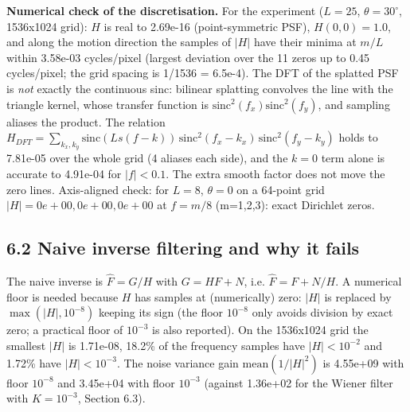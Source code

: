 \documentclass[10pt,a4paper]{article}
\begin{document}
\textbf{Numerical check of the discretisation.} For the experiment ($L=25$, $\theta=30^\circ$, 1536x1024 grid): $H$ is real to 2.69e-16 (point-symmetric PSF), $H(0,0)=1.0$, and along the motion direction the samples of $|H|$ have their minima at $m/L$ within 3.58e-03 cycles/pixel (largest deviation over the 11 zeros up to 0.45 cycles/pixel; the grid spacing is 1/1536 = 6.5e-4). The DFT of the splatted PSF is \textit{not} exactly the continuous sinc: bilinear splatting convolves the line with the triangle kernel, whose transfer function is $\mathrm{sinc}^2(f_x)\mathrm{sinc}^2(f_y)$, and sampling aliases the product. The relation $H_{DFT}=\sum_{k_x,k_y}\mathrm{sinc}(Ls(f-k))\,\mathrm{sinc}^2(f_x-k_x)\,\mathrm{sinc}^2(f_y-k_y)$ holds to 7.81e-05 over the whole grid (4 aliases each side), and the $k=0$ term alone is accurate to 4.91e-04 for $|f|<0.1$. The extra smooth factor does not move the zero lines. Axis-aligned check: for $L=8$, $\theta=0$ on a 64-point grid $|H|=0e+00, 0e+00, 0e+00$ at $f=m/8$ (m=1,2,3): exact Dirichlet zeros.

\subsection{6.2 Naive inverse filtering and why it fails}
The naive inverse is $\hat F=G/H$ with $G=HF+N$, i.e. $\hat F=F+N/H$. A numerical floor is needed because $H$ has samples at (numerically) zero: $|H|$ is replaced by $\max(|H|,10^{-8})$ keeping its sign (the floor $10^{-8}$ only avoids division by exact zero; a practical floor of $10^{-3}$ is also reported). On the 1536x1024 grid the smallest $|H|$ is 1.71e-08, 18.2\% of the frequency samples have $|H|<10^{-2}$ and 1.72\% have $|H|<10^{-3}$. The noise variance gain $\mathrm{mean}(1/|H|^2)$ is 4.55e+09 with floor $10^{-8}$ and 3.45e+04 with floor $10^{-3}$ (against 1.36e+02 for the Wiener filter with $K=10^{-3}$, Section 6.3).
\end{document}

